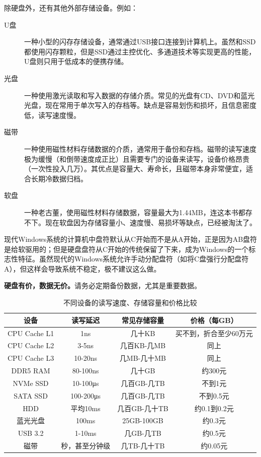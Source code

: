 除硬盘外，还有其他外部存储设备。例如：
\begin{description}
  \item[U盘] 一种小型的闪存存储设备，通常通过USB接口连接到计算机上。虽然和SSD都使用闪存颗粒，但是SSD通过主控优化、多通道技术等实现更高的性能，U盘则只用于低成本的便携存储。
  \item[光盘] 一种使用激光读取和写入数据的存储介质。常见的光盘有CD、DVD和蓝光光盘，现在常用于单次写入的存档等。缺点是容易划伤和损坏，且信息密度低，读写速度慢。
  \item[磁带] 一种使用磁性材料存储数据的介质，通常用于备份和存档。磁带的读写速度极为缓慢（和倒带速度成正比）且需要专门的设备来读写，设备价格昂贵（一次性投入几万）。其优点是容量大、寿命长，且磁带本身非常便宜，适合长期冷数据归档。
  \item[软盘] 一种老古董，使用磁性材料存储数据，容量最大为1.44MB，连这本书都存不下。现在软盘因为存储容量小、速度慢、易损坏等缺点，已经被淘汰了。
\end{description}

\begin{note}
  现代Windows系统的计算机中盘符默认从C开始而不是从A开始，正是因为AB盘符是给软驱用的；但是硬盘盘符从C开始的传统保留了下来，成为Windows的一个标志性特征。虽然现代的Windows系统允许手动分配盘符（如将C盘强行分配盘符A），但这样会导致系统不稳定，极不建议这么做。
\end{note}

\begin{caution}
\textbf{硬盘有价，数据无价。}请务必定期备份数据，尤其是重要数据。
\end{caution}

\begin{table}[htbp]
  \centering
  \caption{不同设备的读写速度、存储容量和价格比较}
  \begin{tabular}{cccc}
    \toprule
    设备 & 读写延迟 & 常见存储容量 & 价格（每GB） \\
    \midrule
    CPU Cache L1 & 1ns & 几十KB & 买不到，折合至少60万元 \\
    CPU Cache L2 & 3-5ns & 几百KB-几MB & 同上 \\
    CPU Cache L3 & 10-20ns & 几MB-几十MB & 同上 \\
    \midrule
    DDR5 RAM & 80-100ns & 几十GB & 约300元 \\
    \midrule
    NVMe SSD & 10-100μs & 几百GB-几TB & 不到1元 \\
    SATA SSD & 100-200μs & 几百GB-几TB & 不到0.5元 \\
    HDD & 平均10ms & 几百GB-几十TB & 约0.1到0.2元 \\
    \midrule
    蓝光光盘 & 100ms & 25GB-100GB & 约0.3元 \\
    USB 3.2 & 1-10ms & 几GB-几TB & 约0.5元 \\
    磁带 & 秒，甚至分钟级 & 几TB-几十TB & 约0.05元 \\
    \bottomrule
  \end{tabular}
\end{table}

